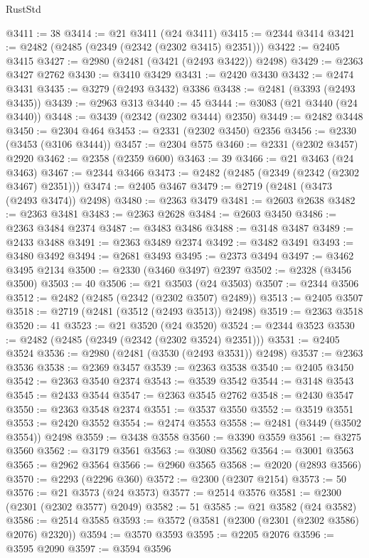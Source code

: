 \begin{lexlean}{RustStd}
\begin{coremodule}
@3411 := 38
@3414 := @21 @3411 (@24 @3411)
@3415 := @2344 @3414
@3421 := @2482 (@2485 (@2349 (@2342 (@2302 @3415) @2351)))
@3422 := @2405 @3415
@3427 := @2980 (@2481 (@3421 (@2493 @3422)) @2498)
@3429 := @2363 @3427 @2762
@3430 := @3410 @3429
@3431 := @2420 @3430
@3432 := @2474 @3431
@3435 := @3279 (@2493 @3432) @3386
@3438 := @2481 (@3393 (@2493 @3435))
@3439 := @2963 @313
@3440 := 45
@3444 := @3083 (@21 @3440 (@24 @3440))
@3448 := @3439 (@2342 (@2302 @3444) @2350)
@3449 := @2482 @3448
@3450 := @2304 @464
@3453 := @2331 (@2302 @3450) @2356
@3456 := @2330 (@3453 (@3106 @3444))
@3457 := @2304 @575
@3460 := @2331 (@2302 @3457) @2920
@3462 := @2358 (@2359 @600)
@3463 := 39
@3466 := @21 @3463 (@24 @3463)
@3467 := @2344 @3466
@3473 := @2482 (@2485 (@2349 (@2342 (@2302 @3467) @2351)))
@3474 := @2405 @3467
@3479 := @2719 (@2481 (@3473 (@2493 @3474)) @2498)
@3480 := @2363 @3479
@3481 := @2603 @2638
@3482 := @2363 @3481
@3483 := @2363 @2628
@3484 := @2603 @3450
@3486 := @2363 @3484 @2374
@3487 := @3483 @3486
@3488 := @3148 @3487
@3489 := @2433 @3488
@3491 := @2363 @3489 @2374
@3492 := @3482 @3491
@3493 := @3480 @3492
@3494 := @2681 @3493
@3495 := @2373 @3494
@3497 := @3462 @3495 @2134
@3500 := @2330 (@3460 @3497) @2397
@3502 := @2328 (@3456 @3500)
@3503 := 40
@3506 := @21 @3503 (@24 @3503)
@3507 := @2344 @3506
@3512 := @2482 (@2485 (@2342 (@2302 @3507) @2489))
@3513 := @2405 @3507
@3518 := @2719 (@2481 (@3512 (@2493 @3513)) @2498)
@3519 := @2363 @3518
@3520 := 41
@3523 := @21 @3520 (@24 @3520)
@3524 := @2344 @3523
@3530 := @2482 (@2485 (@2349 (@2342 (@2302 @3524) @2351)))
@3531 := @2405 @3524
@3536 := @2980 (@2481 (@3530 (@2493 @3531)) @2498)
@3537 := @2363 @3536
@3538 := @2369 @3457
@3539 := @2363 @3538
@3540 := @2405 @3450
@3542 := @2363 @3540 @2374
@3543 := @3539 @3542
@3544 := @3148 @3543
@3545 := @2433 @3544
@3547 := @2363 @3545 @2762
@3548 := @2430 @3547
@3550 := @2363 @3548 @2374
@3551 := @3537 @3550
@3552 := @3519 @3551
@3553 := @2420 @3552
@3554 := @2474 @3553
@3558 := @2481 (@3449 (@3502 @3554)) @2498
@3559 := @3438 @3558
@3560 := @3390 @3559
@3561 := @3275 @3560
@3562 := @3179 @3561
@3563 := @3080 @3562
@3564 := @3001 @3563
@3565 := @2962 @3564
@3566 := @2960 @3565
@3568 := @2020 (@2893 @3566)
@3570 := @2293 (@2296 @360)
@3572 := @2300 (@2307 @2154)
@3573 := 50
@3576 := @21 @3573 (@24 @3573)
@3577 := @2514 @3576
@3581 := @2300 (@2301 (@2302 @3577) @2049)
@3582 := 51
@3585 := @21 @3582 (@24 @3582)
@3586 := @2514 @3585
@3593 := @3572 (@3581 (@2300 (@2301 (@2302 @3586) @2076) @2320))
@3594 := @3570 @3593
@3595 := @2205 @2076
@3596 := @3595 @2090
@3597 := @3594 @3596

\end{coremodule}
\end{lexlean}
